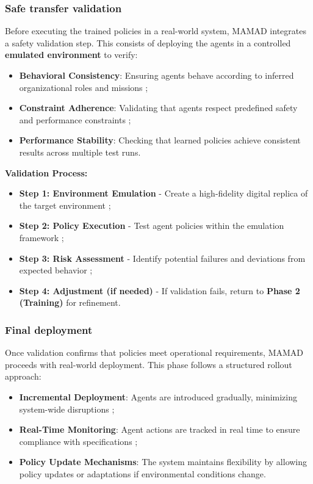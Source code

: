 \documentclass[pdflatex,sn-mathphys-num]{sn-jnl}%
\theoremstyle{thmstyleone}%
\theoremstyle{thmstyletwo}%
\theoremstyle{thmstylethree}%
\begin{document}
\subsubsection{Safe transfer validation}
Before executing the trained policies in a real-world system, MAMAD integrates a safety validation step. This consists of deploying the agents in a controlled \textbf{emulated environment} to verify:
\begin{itemize}
    \item \textbf{Behavioral Consistency}: Ensuring agents behave according to inferred organizational roles and missions ;
    \item \textbf{Constraint Adherence}: Validating that agents respect predefined safety and performance constraints ;
    \item \textbf{Performance Stability}: Checking that learned policies achieve consistent results across multiple test runs.
\end{itemize}

\noindent \textbf{Validation Process:}
\begin{itemize}
    \item \textbf{Step 1: Environment Emulation} - Create a high-fidelity digital replica of the target environment ;
    \item \textbf{Step 2: Policy Execution} - Test agent policies within the emulation framework ;
    \item \textbf{Step 3: Risk Assessment} - Identify potential failures and deviations from expected behavior ;
    \item \textbf{Step 4: Adjustment (if needed)} - If validation fails, return to \textbf{Phase 2 (Training)} for refinement.
\end{itemize}

\subsubsection{Final deployment}
Once validation confirms that policies meet operational requirements, MAMAD proceeds with real-world deployment. This phase follows a structured rollout approach:

\begin{itemize}
    \item \textbf{Incremental Deployment}: Agents are introduced gradually, minimizing system-wide disruptions ;
    \item \textbf{Real-Time Monitoring}: Agent actions are tracked in real time to ensure compliance with specifications ;
    \item \textbf{Policy Update Mechanisms}: The system maintains flexibility by allowing policy updates or adaptations if environmental conditions change.
\end{itemize}
\end{document}
